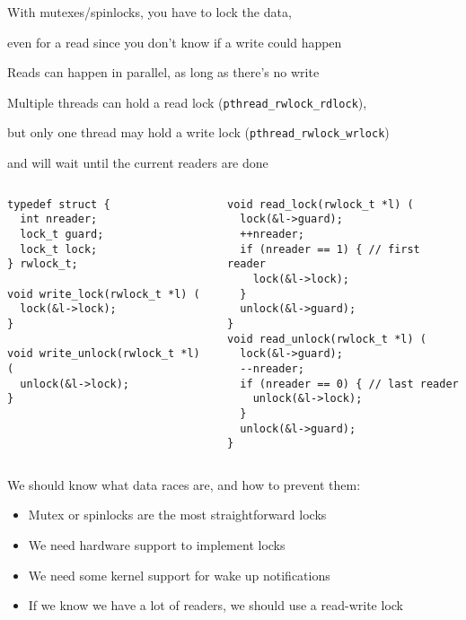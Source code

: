   \begin{slide}


    With mutexes/spinlocks, you have to lock the data,

    \leftspace{}even for a read since you don't know if a write could happen
    \medskip

    Reads can happen in parallel, as long as there's no write
    \medskip

    Multiple threads can hold a read lock ({\tt pthread\_rwlock\_rdlock}),

    \leftspace{}but only one thread may hold a write lock ({\tt pthread\_rwlock\_wrlock})

    \leftspace{}and will wait until the current readers are done

  \end{slide}

  \begin{slide}


    \begin{columns}
      \begin{column}{0.5\textwidth}
        \begin{verbatim}
typedef struct {
  int nreader;
  lock_t guard;
  lock_t lock;
} rwlock_t;

void write_lock(rwlock_t *l) (
  lock(&l->lock);
}

void write_unlock(rwlock_t *l) (
  unlock(&l->lock);
}
        \end{verbatim}
      \end{column}
      \begin{column}{0.5\textwidth}
        \begin{verbatim}
void read_lock(rwlock_t *l) (
  lock(&l->guard);
  ++nreader;
  if (nreader == 1) { // first reader
    lock(&l->lock);
  }
  unlock(&l->guard);
}
void read_unlock(rwlock_t *l) (
  lock(&l->guard);
  --nreader;
  if (nreader == 0) { // last reader
    unlock(&l->lock);
  }
  unlock(&l->guard);
}
        \end{verbatim}
      \end{column}
    \end{columns}

  \end{slide}

  \begin{slide}

    We should know what data races are, and how to prevent them:
    \begin{itemize}
      \item Mutex or spinlocks are the most straightforward locks
      \item We need hardware support to implement locks
      \item We need some kernel support for wake up notifications
      \item If we know we have a lot of readers, we should use a read-write lock
    \end{itemize}
  \end{slide}


